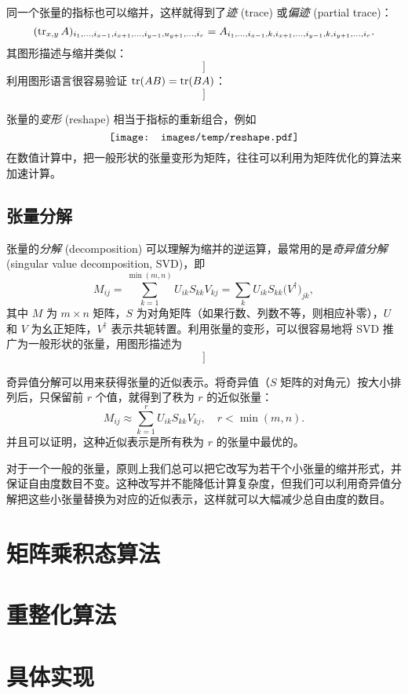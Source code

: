同一个张量的指标也可以缩并，这样就得到了\emph{迹} (trace) 或\emph{偏迹} (partial trace)：
\begin{equation}
    (\operatorname{tr}_{x,y} A)_{i_1,\dots,i_{x-1},i_{x+1},\dots,i_{y-1},u_{y+1},\dots,i_r}
  = A_{i_1,\dots,i_{x-1},k,i_{x+1},\dots,i_{y-1},k,i_{y+1},\dots,i_r}.
\end{equation}
其图形描述与缩并类似：
\begin{equation}
  [[TODO:]]
\end{equation}
利用图形语言很容易验证 $\operatorname{tr}(AB)=\operatorname{tr}(BA)$：
\begin{equation}
  [[TODO:]]
\end{equation}

张量的\emph{变形} (reshape) 相当于指标的重新组合，例如
\begin{equation}
  \mbox{\texttt{[image: images/temp/reshape.pdf]}}
\end{equation}
在数值计算中，把一般形状的张量变形为矩阵，往往可以利用为矩阵优化的算法来加速计算。

\subsection{张量分解}

张量的\emph{分解} (decomposition) 可以理解为缩并的逆运算，最常用的是\emph{奇异值分解} (singular value decomposition, SVD)，即
\begin{equation}
  M_{ij} = \sum_{k=1}^{\min(m,n)} U_{ik} S_{kk} V_{kj} = \sum_k U_{ik} S_{kk} \bigl( V^\dagger \bigr)_{jk},
\end{equation}
其中 $M$ 为 $m\times n$ 矩阵，$S$ 为对角矩阵（如果行数、列数不等，则相应补零），$U$ 和 $V$ 为幺正矩阵，$V^\dagger$ 表示共轭转置。利用张量的变形，可以很容易地将 SVD 推广为一般形状的张量，用图形描述为
\begin{equation}
  [[TODO:]]
\end{equation}

奇异值分解可以用来获得张量的近似表示。将奇异值（$S$ 矩阵的对角元）按大小排列后，只保留前 $r$ 个值，就得到了秩为 $r$ 的近似张量：
\begin{equation}
  M_{ij} \approx \sum_{k=1}^r U_{ik} S_{kk} V_{kj}, \quad r < \min(m,n).
\end{equation}
并且可以证明，这种近似表示是所有秩为 $r$ 的张量中最优的。

对于一个一般的张量，原则上我们总可以把它改写为若干个小张量的缩并形式，并保证自由度数目不变。这种改写并不能降低计算复杂度，但我们可以利用奇异值分解把这些小张量替换为对应的近似表示，这样就可以大幅减少总自由度的数目。

\section{矩阵乘积态算法}

\section{重整化算法}

\section{具体实现}

\citet{harris2020array,virtanen2020scipy}
